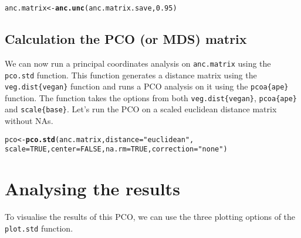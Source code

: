 \documentclass[a4paper,11pt]{article}\usepackage[]{graphicx}\usepackage[]{color}
\makeatletter
\newcommand{\hlnum}[1]{\textcolor[rgb]{0.686,0.059,0.569}{#1}}%
\newcommand{\hlstr}[1]{\textcolor[rgb]{0.192,0.494,0.8}{#1}}%
\newcommand{\hlstd}[1]{\textcolor[rgb]{0.345,0.345,0.345}{#1}}%
\newcommand{\hlkwb}[1]{\textcolor[rgb]{0.69,0.353,0.396}{#1}}%
\newcommand{\hlkwc}[1]{\textcolor[rgb]{0.333,0.667,0.333}{#1}}%
\newcommand{\hlkwd}[1]{\textcolor[rgb]{0.737,0.353,0.396}{\textbf{#1}}}%
\newenvironment{kframe}{%
 \def\at@end@of@kframe{}%
 \ifinner\ifhmode%
  \def\at@end@of@kframe{\end{minipage}}%
  \begin{minipage}{\columnwidth}%
 \fi\fi%
 \def\FrameCommand##1{\hskip\@totalleftmargin \hskip-\fboxsep
 \colorbox{shadecolor}{##1}\hskip-\fboxsep
     \hskip-\linewidth \hskip-\@totalleftmargin \hskip\columnwidth}%
 \MakeFramed {\advance\hsize-\width
   \@totalleftmargin\z@ \linewidth\hsize
   \@setminipage}}%
 {\par\unskip\endMakeFramed%
 \at@end@of@kframe}
\newenvironment{knitrout}{}{} %
\makeatother
\begin{document}
\begin{knitrout}
\color{fgcolor}\begin{kframe}
\begin{alltt}
\hlstd{anc.matrix}\hlkwb{<-}\hlkwd{anc.unc}\hlstd{(anc.matrix.save,} \hlnum{0.95}\hlstd{)}
\end{alltt}
\end{kframe}
\end{knitrout}

\subsection{Calculation the PCO (or MDS) matrix}
We can now run a principal coordinates analysis on \texttt{anc.matrix} using the \texttt{pco.std} function.
This function generates a distance matrix using the \texttt{veg.dist\{vegan\}} function and runs a PCO analysis on it using the \texttt{pcoa\{ape\}} function.
The function takes the options from both \texttt{veg.dist\{vegan\}}, \texttt{pcoa\{ape\}} and \texttt{scale\{base\}}.
Let's run the PCO on a scaled euclidean distance matrix without NAs.

\begin{knitrout}
\color{fgcolor}\begin{kframe}
\begin{alltt}
\hlstd{pco}\hlkwb{<-}\hlkwd{pco.std}\hlstd{(anc.matrix,} \hlkwc{distance}\hlstd{=}\hlstr{"euclidean"}\hlstd{,}
    \hlkwc{scale}\hlstd{=}\hlnum{TRUE}\hlstd{,} \hlkwc{center}\hlstd{=}\hlnum{FALSE}\hlstd{,} \hlkwc{na.rm}\hlstd{=}\hlnum{TRUE}\hlstd{,} \hlkwc{correction}\hlstd{=}\hlstr{"none"}\hlstd{)}
\end{alltt}


{\ttfamily\noindent{}}\end{kframe}
\end{knitrout}

\section{Analysing the results}
To visualise the results of this PCO, we can use the three plotting options of the \texttt{plot.std} function.
\end{document}
